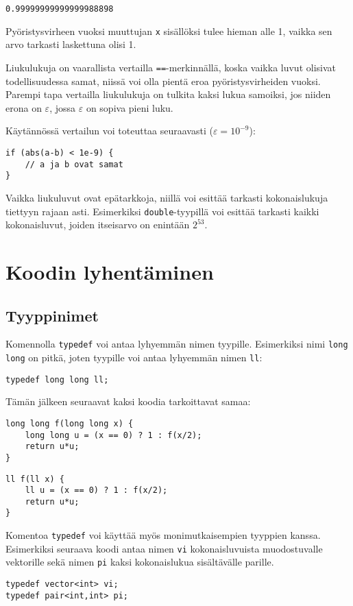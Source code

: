 \begin{lstlisting}
0.99999999999999988898
\end{lstlisting}

Pyöristysvirheen vuoksi muuttujan \texttt{x}
sisällöksi tulee hieman alle 1,
vaikka sen arvo tarkasti laskettuna olisi 1.

Liukulukuja on vaarallista vertailla \texttt{==}-merkinnällä,
koska vaikka luvut olisivat todellisuudessa samat,
niissä voi olla pientä eroa pyöristysvirheiden vuoksi.
Parempi tapa vertailla liukulukuja on
tulkita kaksi lukua samoiksi, jos niiden erona on $\varepsilon$,
jossa $\varepsilon$ on sopiva pieni luku.

Käytännössä vertailun voi toteuttaa seuraavasti ($\varepsilon=10^{-9}$):

\begin{lstlisting}
if (abs(a-b) < 1e-9) {
    // a ja b ovat samat
}
\end{lstlisting}

Vaikka liukuluvut ovat epätarkkoja, niillä voi esittää
tarkasti kokonaislukuja tiettyyn rajaan asti.
Esimerkiksi \texttt{double}-tyypillä voi esittää
tarkasti kaikki kokonaisluvut, joiden itseisarvo
on enintään $2^{53}$.
% 

\section{Koodin lyhentäminen}

\subsection{Tyyppinimet}

Komennolla \texttt{typedef} voi antaa lyhyemmän
nimen tyypille.
Esimerkiksi nimi \texttt{long long} on pitkä,
joten tyypille voi antaa lyhyemmän nimen \texttt{ll}:
\begin{lstlisting}
typedef long long ll;
\end{lstlisting}
Tämän jälkeen seuraavat kaksi koodia tarkoittavat samaa:
\begin{lstlisting}
long long f(long long x) {
    long long u = (x == 0) ? 1 : f(x/2);
    return u*u;
}
\end{lstlisting}
\begin{lstlisting}
ll f(ll x) {
    ll u = (x == 0) ? 1 : f(x/2);
    return u*u;
}
\end{lstlisting}
Komentoa \texttt{typedef} voi käyttää myös
monimutkaisempien tyyppien kanssa.
Esimerkiksi seuraava koodi antaa nimen \texttt{vi}
kokonaisluvuista muodostuvalle vektorille
sekä nimen \texttt{pi} kaksi
kokonaislukua sisältävälle parille.
\begin{lstlisting}
typedef vector<int> vi;
typedef pair<int,int> pi;
\end{lstlisting}

